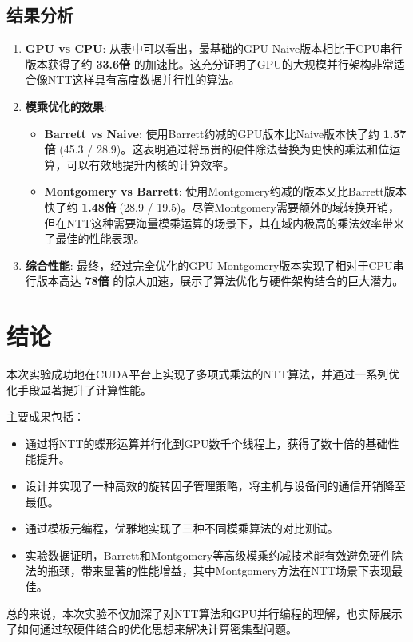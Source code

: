 \documentclass[a4paper]{article}
\begin{document}
\subsection{结果分析}
\begin{enumerate}
    \item \textbf{GPU vs CPU}: 从表中可以看出，最基础的GPU Naive版本相比于CPU串行版本获得了约 \textbf{33.6倍} 的加速比。这充分证明了GPU的大规模并行架构非常适合像NTT这样具有高度数据并行性的算法。

    \item \textbf{模乘优化的效果}:
    \begin{itemize}
        \item \textbf{Barrett vs Naive}: 使用Barrett约减的GPU版本比Naive版本快了约 \textbf{1.57倍} (45.3 / 28.9)。这表明通过将昂贵的硬件除法替换为更快的乘法和位运算，可以有效地提升内核的计算效率。
        \item \textbf{Montgomery vs Barrett}: 使用Montgomery约减的版本又比Barrett版本快了约 \textbf{1.48倍} (28.9 / 19.5)。尽管Montgomery需要额外的域转换开销，但在NTT这种需要海量模乘运算的场景下，其在域内极高的乘法效率带来了最佳的性能表现。
    \end{itemize}

    \item \textbf{综合性能}: 最终，经过完全优化的GPU Montgomery版本实现了相对于CPU串行版本高达 \textbf{78倍} 的惊人加速，展示了算法优化与硬件架构结合的巨大潜力。
\end{enumerate}

\section{结论}
本次实验成功地在CUDA平台上实现了多项式乘法的NTT算法，并通过一系列优化手段显著提升了计算性能。

主要成果包括：
\begin{itemize}
    \item 通过将NTT的蝶形运算并行化到GPU数千个线程上，获得了数十倍的基础性能提升。
    \item 设计并实现了一种高效的旋转因子管理策略，将主机与设备间的通信开销降至最低。
    \item 通过模板元编程，优雅地实现了三种不同模乘算法的对比测试。
    \item 实验数据证明，Barrett和Montgomery等高级模乘约减技术能有效避免硬件除法的瓶颈，带来显著的性能增益，其中Montgomery方法在NTT场景下表现最佳。
\end{itemize}

总的来说，本次实验不仅加深了对NTT算法和GPU并行编程的理解，也实际展示了如何通过软硬件结合的优化思想来解决计算密集型问题。
\end{document}
